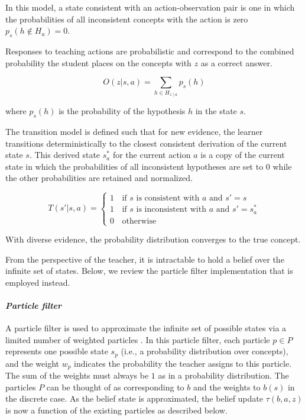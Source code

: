 In this model, a state consistent with an action-observation pair is one in which the probabilities of all inconsistent concepts with the action is zero $p_s(h \notin H_a) = 0$.

Responses to teaching actions are probabilistic and correspond to the combined probability the student places on the concepts with $z$ as a correct answer.

\begin{equation}
    O(z|s,a) = \sum_{h \in H_{z \mid a}} p_s(h)
\end{equation}

where $p_s(h)$ is the probability of the hypothesis $h$ in the state $s$.

The transition model is defined such that for new evidence, the learner transitions deterministically to the closest consistent derivation of the current state $s$.
This derived state $s_a^*$ for the current action $a$ is a copy of the current state in which the probabilities of all inconsistent hypotheses are set to $0$ while the other probabilities are retained and normalized.

\begin{equation}
    T(s'|s,a) = \begin{cases}
        1     & \, \text{if $s$ is consistent with $a$ and $s' = s$} \\
        1     & \, \text{if $s$ is inconsistent with $a$ and $s' = s_a^*$} \\
        0     & \, \mathrm{otherwise}
    \end{cases}
    \label{eq:cont-ps}
\end{equation}

With diverse evidence, the probability distribution converges to the true concept.

From the perspective of the teacher, it is intractable to hold a belief over the infinite set of states. Below, we review the particle filter implementation that is employed instead.

\paragraph{\textit{Particle filter}}
A particle filter is used to approximate the infinite set of possible states via a limited number of weighted particles \cite{DoucetSeqMCM2001}.
In this particle filter, each particle $p \in P$ represents one possible state $s_p$ (i.e., a probability distribution over concepts), and the weight $w_p$ indicates the probability the teacher assigns to this particle.
The sum of the weights must always be $1$ as in a probability distribution.
The particles $P$ can be thought of as corresponding to $b$ and the weights to $b(s)$ in the discrete case.
As the belief state is approximated, the belief update $\tau(b,a,z)$ is now a function of the existing particles as described below.

